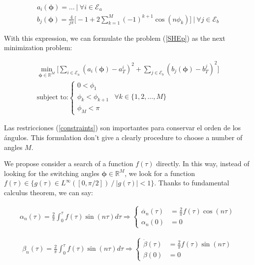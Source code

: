 \begin{gather}
    a_i(\bm{\phi})  = \dots  \ | \ \forall i \in \mathcal{E}_a \\
    b_j(\bm{\phi})  =  \frac{4}{j\pi  } \bigg[ -1 + 2\sum_{k=1}^M  (-1)^{k+1}\cos(n\phi_k) \bigg] \ | \ \forall j \in \mathcal{E}_b
\end{gather}

With this expression, we can formulate the problem (\ref{SHEp}) as the next minimization problem:

\begin{problem}\label{SHEp_clas}
    \begin{gather}
        \min_{\bm{\phi} \in \mathbb{R}^M} \Big[
        \sum_{i \in \mathcal{E}_a} (a_i(\bm{\phi}) - a^i_T)^2 + 
        \sum_{j \in \mathcal{E}_b} (b_j(\bm{\phi}) - b^j_T)^2  
        \Big] \\
        \text{subject to:} \begin{cases}
            0 < \phi_1  \\
            \phi_k < \phi_{k+1} &  \forall k \in \{1,2,\dots,M \}\\
            \phi_{M} < \pi
        \end{cases} \label{constraints}
    \end{gather}     
\end{problem}

Las restricciones (\ref{constraints}) son importantes para conservar el orden de los ángulos. This formulation don't give a clearly procedure to choose a number of angles $M$.
\newline

We propose consider a search of a function $f(\tau)$ directly. In this way, instead of looking for the switching angles $\bm{\phi} \in \mathbb{R}^M$, we look for a function $f(\tau) \in \{ g(\tau)  \in L^\infty([0,\pi/2])\ /\ |g(\tau)| < 1\} $. Thanks to fundamental calculus theorem, we can say:

\begin{gather}
    \alpha_n(\tau) = \frac{2}{\pi}\int_0^\tau f(\tau) \sin(n\tau)d\tau 
    \Rightarrow
    \begin{cases} \label{ode}
        \dot{\alpha_n}(\tau) & = \frac{2}{\pi}f(\tau)\cos(n\tau) \\  
        \alpha_n(0) & = 0       
    \end{cases}
\end{gather}

\begin{gather}
    \beta_n(\tau) = \frac{2}{\pi}\int_0^\tau f(\tau) \sin(n\tau)d\tau 
    \Rightarrow
    \begin{cases} \label{ode}
        \dot{\beta}(\tau) & = \frac{2}{\pi}f(\tau)\sin(n\tau) \\  
        \beta(0) & = 0       
    \end{cases}
\end{gather}


